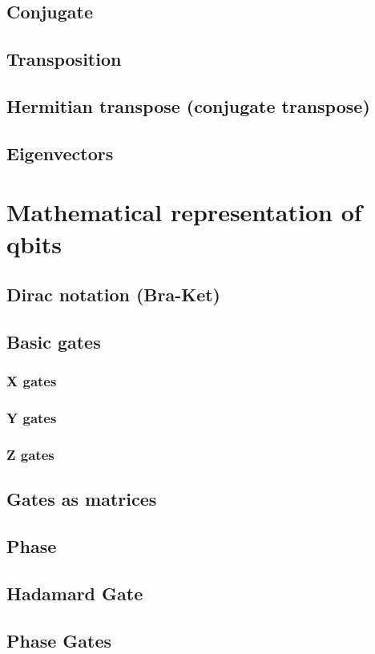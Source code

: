 \documentclass{article}
\begin{document}
\subsection{Conjugate}
\subsection{Transposition}
\subsection{Hermitian transpose (conjugate transpose)}
\subsection{Eigenvectors}

\section{Mathematical representation of qbits}
\subsection{Dirac notation (Bra-Ket)}
\subsection{Basic gates}
\subsubsection{X gates}
\subsubsection{Y gates}
\subsubsection{Z gates}
\subsection{Gates as matrices}
\subsection{Phase}
\subsection{Hadamard Gate}
\subsection{Phase Gates}
\end{document}

